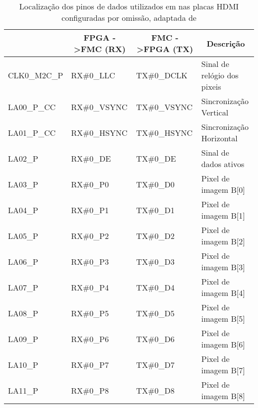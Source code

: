 \begin{longtable}[h!]
	{@{}llll@{}}
		\caption{Localização dos pinos de dados utilizados em nas placas HDMI configuradas por omissão, adaptada de \cite{R009}}
		\label{table:HDMIdataDefaultdetail}
		\hline
		\centering	
		\multicolumn{1}{c}{\textbf{PORTA}} & \multicolumn{1}{c}{\textbf{FPGA -\textgreater FMC (RX)}} & \multicolumn{1}{c}{\textbf{FMC -\textgreater FPGA (TX)}} & \multicolumn{1}{c}{\textbf{Descrição}} \\ \hline \endhead
		CLK0\_M2C\_P & RX\#0\_LLC                           & TX\#0\_DCLK                        & Sinal de relógio dos pixeis         \\ 
		LA00\_P\_CC  & RX\#0\_VSYNC                         & TX\#0\_VSYNC                       & Sincronização Vertical          \\ 
		LA01\_P\_CC  & RX\#0\_HSYNC                         & TX\#0\_HSYNC                       & Sincronização Horizontal        \\ 
		LA02\_P      & RX\#0\_DE                            & TX\#0\_DE                          & Sinal de dados ativos    \\ 
		LA03\_P      & RX\#0\_P0                            & TX\#0\_D0                          & Pixel de imagem B{[}0{]} \\ 
		LA04\_P      & RX\#0\_P1                            & TX\#0\_D1                          & Pixel de imagem B{[}1{]} \\ 
		LA05\_P      & RX\#0\_P2                            & TX\#0\_D2                          & Pixel de imagem B{[}2{]} \\ 
		LA06\_P      & RX\#0\_P3                            & TX\#0\_D3                          & Pixel de imagem B{[}3{]} \\ 
		LA07\_P      & RX\#0\_P4                            & TX\#0\_D4                          & Pixel de imagem B{[}4{]} \\ 
		LA08\_P      & RX\#0\_P5                            & TX\#0\_D5                          & Pixel de imagem B{[}5{]} \\ 
		LA09\_P      & RX\#0\_P6                            & TX\#0\_D6                          & Pixel de imagem B{[}6{]} \\ 
		LA10\_P      & RX\#0\_P7                            & TX\#0\_D7                          & Pixel de imagem B{[}7{]} \\ 
		LA11\_P      & RX\#0\_P8                            & TX\#0\_D8                          & Pixel de imagem B{[}8{]} \\ 

\end{longtable}
